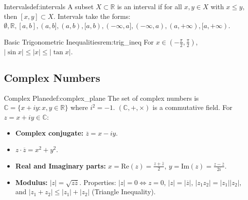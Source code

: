 \documentclass[11pt, a4paper]{article}
\begin{document}
\begin{definition}{Intervals}{def:intervals}
A subset $X \subset \mathbb{R}$ is an interval if for all $x, y \in X$ with $x \le y$, then $[x, y] \subset X$. Intervals take the forms: $\emptyset, \mathbb{R}, [a,b], (a,b], (a,b), [a,b), (-\infty,a], (-\infty,a), (a,+\infty), [a,+\infty)$.
\end{definition}

\begin{remark}{Basic Trigonometric Inequalities}{rem:trig_ineq}
For $x \in (-\frac{\pi}{2}, \frac{\pi}{2})$, $|\sin x| \le |x| \le |\tan x|$.
\end{remark}

\subsection{Complex Numbers}

\begin{definition}{Complex Plane}{def:complex_plane}
The set of complex numbers is $\mathbb{C} = \{x + iy : x, y \in \mathbb{R}\}$ where $i^2 = -1$. $(\mathbb{C}, +, \times)$ is a commutative field.
For $z = x + iy \in \mathbb{C}$:
\begin{itemize}
    \item \textbf{Complex conjugate:} $\overline{z} = x - iy$.
    \item $z \cdot \overline{z} = x^2 + y^2$.
    \item \textbf{Real and Imaginary parts:} $x = \text{Re}(z) = \frac{z+\overline{z}}{2}$, $y = \text{Im}(z) = \frac{z-\overline{z}}{2i}$.
    \item \textbf{Modulus:} $|z| = \sqrt{z\overline{z}}$. Properties: $|z|=0 \iff z=0$, $|z| = |\overline{z}|$, $|z_1 z_2| = |z_1||z_2|$, and $|z_1 + z_2| \le |z_1| + |z_2|$ (Triangle Inequality).
\end{itemize}
\end{definition}
\end{document}
